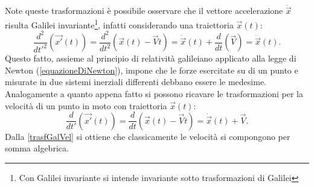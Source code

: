 Note queste trasformazioni è possibile osservare che il vettore accelerazione $\ddot{\vec{x}}$ risulta Galilei invariante\footnote{Con Galilei invariante si intende invariante sotto trasformazioni di Galilei}, infatti considerando una traiettoria $\vec{x}(t)$:
\begin{equation*}
	\frac{d^2}{dt'^2}(\vec{x'}(t))=\frac{d^2}{dt^2}(\vec{x}(t)-\vec{V}t)=\ddot{\vec{x}}(t)+\frac{d}{dt}(\vec{V})=\ddot{\vec{x}}(t).
\end{equation*} 
Questo fatto, assieme al principio di relatività galileiano applicato alla legge di Newton (\ref{equazioneDiNewton}), 
impone che le forze esercitate su di un punto e misurate in due sistemi inerziali differenti debbano essere le medesime. \\
Analogamente a quanto appena fatto si possono ricavare le trasformazioni per la velocità di un punto in moto con traiettoria $\vec{x}(t)$:
\begin{equation}
	\frac{d}{dt'}(\vec{x'}(t))=\frac{d}{dt}(\vec{x}(t)-\vec{V}t)=\dot{\vec{x}}(t)+\vec{V}.\label{trasfGalVel}
\end{equation}
Dalla \eqref{trasfGalVel} si ottiene che classicamente le velocità si compongono per somma algebrica.\\

